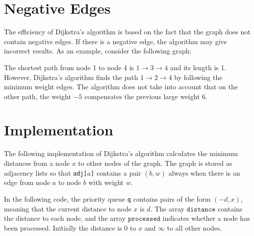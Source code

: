\documentclass[twoside,12pt,a4paper,english]{book}
\theoremstyle{definition}
\theoremstyle{problemstyle}
\theoremstyle{problemstyle}
\theoremstyle{problemstyle}
\begin{document}
\centerline{}

\section{Negative Edges}

The efficiency of Dijkstra's algorithm is
based on the fact that the graph does not
contain negative edges.
If there is a negative edge,
the algorithm may give incorrect results.
As an example, consider the following graph:

\begin{center}
\end{center}
\noindent
The shortest path from node 1 to node 4 is
$1 \rightarrow 3 \rightarrow 4$
and its length is 1.
However, Dijkstra's algorithm
finds the path $1 \rightarrow 2 \rightarrow 4$
by following the minimum weight edges.
The algorithm does not take into account that
on the other path, the weight $-5$
compensates the previous large weight $6$.
\newpage

\section{Implementation}

The following implementation of Dijkstra's algorithm
calculates the minimum distances from a node $x$
to other nodes of the graph.
The graph is stored as adjacency lists
so that \texttt{adj[$a$]} contains a pair $(b,w)$
always when there is an edge from node $a$ to node $b$
with weight $w$.

In the following code, the priority queue
\texttt{q} contains pairs of the form $(-d,x)$,
meaning that the current distance to node $x$ is $d$.
The array $\texttt{distance}$ contains the distance to
each node, and the array $\texttt{processed}$ indicates
whether a node has been processed.
Initially the distance is $0$ to $x$ and $\infty$ to all other nodes.
\end{document}
